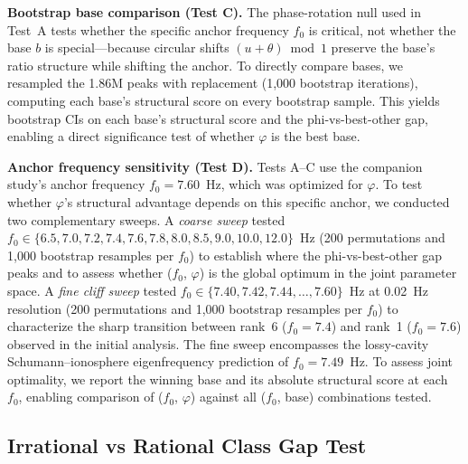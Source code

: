 \documentclass[11pt,a4paper]{article}
\newcommand{\phisym}{\varphi}
\newcommand{\fzero}{f_0}
\begin{document}
\textbf{Bootstrap base comparison (Test C).} The phase-rotation null used in Test~A tests whether the specific anchor frequency $\fzero$ is critical, not whether the base $b$ is special---because circular shifts $(u + \theta) \bmod 1$ preserve the base's ratio structure while shifting the anchor. To directly compare bases, we resampled the 1.86M peaks with replacement (1,000 bootstrap iterations), computing each base's structural score on every bootstrap sample. This yields bootstrap CIs on each base's structural score and the phi-vs-best-other gap, enabling a direct significance test of whether $\phisym$ is the best base.

\textbf{Anchor frequency sensitivity (Test D).} Tests A--C use the companion study's anchor frequency $\fzero = 7.60$~Hz, which was optimized for $\phisym$. To test whether $\phisym$'s structural advantage depends on this specific anchor, we conducted two complementary sweeps. A \emph{coarse sweep} tested $\fzero \in \{6.5, 7.0, 7.2, 7.4, 7.6, 7.8, 8.0, 8.5, 9.0, 10.0, 12.0\}$~Hz (200 permutations and 1,000 bootstrap resamples per $\fzero$) to establish where the phi-vs-best-other gap peaks and to assess whether ($\fzero$, $\phisym$) is the global optimum in the joint parameter space. A \emph{fine cliff sweep} tested $\fzero \in \{7.40, 7.42, 7.44, \ldots, 7.60\}$~Hz at 0.02~Hz resolution (200 permutations and 1,000 bootstrap resamples per $\fzero$) to characterize the sharp transition between rank~6 ($\fzero = 7.4$) and rank~1 ($\fzero = 7.6$) observed in the initial analysis. The fine sweep encompasses the lossy-cavity Schumann--ionosphere eigenfrequency prediction of $\fzero = 7.49$~Hz. To assess joint optimality, we report the winning base and its absolute structural score at each $\fzero$, enabling comparison of ($\fzero$, $\phisym$) against all ($\fzero$, base) combinations tested.

\subsection{Irrational vs Rational Class Gap Test}
\label{sec:class_gap}
\end{document}
